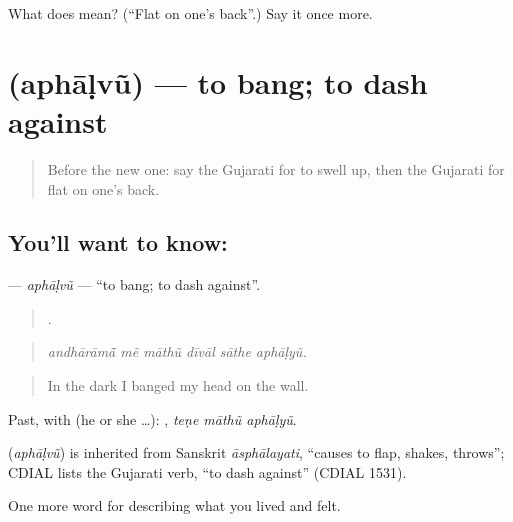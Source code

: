 \begin{tcolorbox}[breakable,colback=teal!4,colframe=teal!35!black,title={Before you move on}]
What does  mean? (\textquotedblleft{}Flat on one's back\textquotedblright{}.) Say it once more.
\end{tcolorbox}
\section[\texorpdfstring{\gu{અફાળવું} (aphāḷvũ)}{અફાળવું (aphāḷvũ)}]{ (aphāḷvũ) — to bang; to dash against}

\label{lesson:GU-C482-aphalvu}



\begin{quote}
Before the new one: say the Gujarati for to swell up, then the Gujarati for flat on one's back.
\end{quote}

\subsection*{You'll want to know: }
\textbf{} — \emph{aphāḷvũ} — \textquotedblleft{}to bang; to dash against\textquotedblright{}.

\begin{quote}
     .
\end{quote}

\begin{quote}
\emph{andhārāmā̃ mẽ māthũ dīvāl sāthe aphāḷyũ.}
\end{quote}

\begin{quote}
In the dark I banged my head on the wall.
\end{quote}

Past, with  (he or she …):   , \emph{teṇe māthũ aphāḷyũ}.

\begin{cousinweb}
\textbf{} (\emph{aphāḷvũ}) is inherited from Sanskrit \emph{āsphālayati}, \textquotedblleft{}causes to flap, shakes, throws\textquotedblright{}; CDIAL lists the Gujarati verb, \textquotedblleft{}to dash against\textquotedblright{} (CDIAL 1531).
\end{cousinweb}

\begin{grammarlens}[title={What you've built}]
One more word for describing what you lived and felt.
\end{grammarlens}

